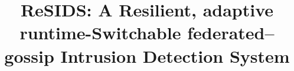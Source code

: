 
\title{ReSIDS: A Resilient, adaptive runtime-Switchable federated--gossip Intrusion Detection System}

